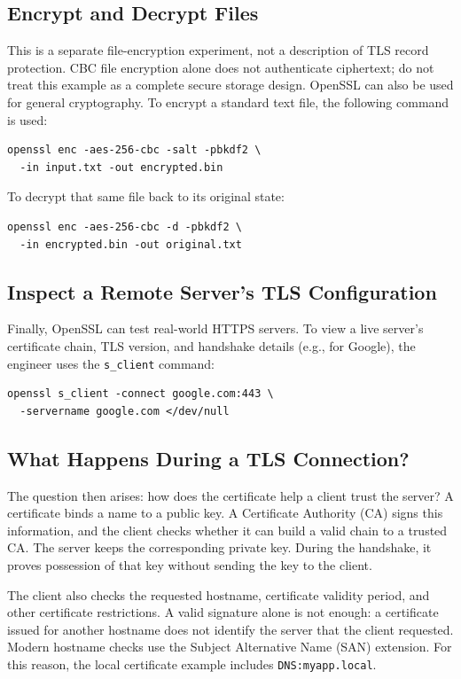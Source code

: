 \documentclass[journal]{IEEEtran}
\begin{document}
\subsection{Encrypt and Decrypt Files}
This is a separate file-encryption experiment, not a description of TLS record protection. CBC file encryption alone does not authenticate ciphertext; do not treat this example as a complete secure storage design.
OpenSSL can also be used for general cryptography. To encrypt a standard text file, the following command is used:
\begin{lstlisting}
openssl enc -aes-256-cbc -salt -pbkdf2 \
  -in input.txt -out encrypted.bin
\end{lstlisting}
To decrypt that same file back to its original state:
\begin{lstlisting}
openssl enc -aes-256-cbc -d -pbkdf2 \
  -in encrypted.bin -out original.txt
\end{lstlisting}

\subsection{Inspect a Remote Server's TLS Configuration}
Finally, OpenSSL can test real-world HTTPS servers. To view a live server's certificate chain, TLS version, and handshake details (e.g., for Google), the engineer uses the \texttt{s\_client} command:
\begin{lstlisting}
openssl s_client -connect google.com:443 \
  -servername google.com </dev/null
\end{lstlisting}

\subsection{What Happens During a TLS Connection?}
The question then arises: how does the certificate help a client trust the server? A certificate binds a name to a public key. A Certificate Authority (CA) signs this information, and the client checks whether it can build a valid chain to a trusted CA. The server keeps the corresponding private key. During the handshake, it proves possession of that key without sending the key to the client.

The client also checks the requested hostname, certificate validity period, and other certificate restrictions. A valid signature alone is not enough: a certificate issued for another hostname does not identify the server that the client requested. Modern hostname checks use the Subject Alternative Name (SAN) extension. For this reason, the local certificate example includes \texttt{DNS:myapp.local}.
\end{document}
